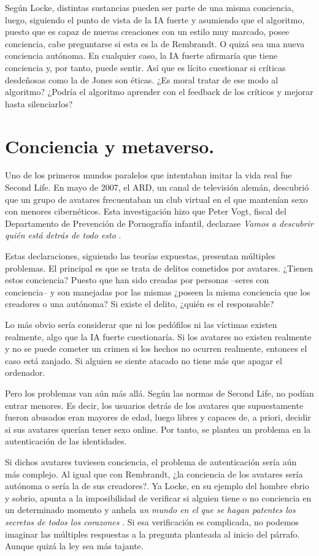 \documentclass[main.tex]{subfiles}
\begin{document}
Según Locke, distintas sustancias pueden ser parte de una misma conciencia, luego, siguiendo el punto de vista de la IA fuerte y asumiendo que el algoritmo, puesto que es capaz de nuevas creaciones con un estilo muy marcado, posee conciencia, cabe preguntarse si esta es la de Rembrandt. O quizá sea una nueva conciencia autónoma. En cualquier caso, la IA fuerte afirmaría que tiene conciencia y, por tanto, puede sentir. Así que es lícito cuestionar si críticas desdeñosas como la de Jones son éticas. ¿Es moral tratar de ese modo al algoritmo? ¿Podría el algoritmo aprender con el feedback de los críticos y mejorar hasta silenciarlos?


\section{Conciencia y metaverso.}


Uno de los primeros mundos paralelos que intentaban imitar la vida real fue Second Life. En mayo de 2007, el ARD, un canal de televisión alemán, descubrió que un grupo de avatares frecuentaban un club virtual en el que mantenían sexo con menores cibernéticos. Esta investigación hizo que Peter Vogt, fiscal del Departamento de Prevención de Pornografía infantil, declarase \textit{Vamos a descubrir quién está detrás de todo esto} \cite{del2l}.

Estas declaraciones, siguiendo las teorías expuestas, presentan múltiples problemas. El principal es que se trata de delitos cometidos por avatares. ¿Tienen estos conciencia? Puesto que han sido creadas por personas –seres con conciencia– y son manejadas por las mismas ¿poseen la misma conciencia que los creadores o una autónoma? Si existe el delito, ¿quién es el responsable?

Lo más obvio sería considerar que ni los pedófilos ni las víctimas existen realmente, algo que la IA fuerte cuestionaría. Si los avatares no existen realmente y no se puede cometer un crimen si los hechos no ocurren realmente, entonces el caso está zanjado. Si alguien se siente atacado no tiene más que apagar el ordenador.

Pero los problemas van aún más allá. Según las normas de Second Life, no podían entrar menores. Es decir, los usuarios detrás de los avatares que supuestamente fueron abusados eran mayores de edad, luego libres y capaces de, a priori, decidir si sus avatares querían tener sexo online. Por tanto, se plantea un problema en la autenticación de las identidades. 


Si dichos avatares tuviesen conciencia, el problema de autenticación sería aún más complejo. Al igual que con Rembrandt, ¿la conciencia de los avatares sería autónoma o sería la de sus creadores?. Ya Locke, en su ejemplo del hombre ebrio y sobrio, apunta a la imposibilidad de verificar si alguien tiene o no conciencia en un determinado momento y anhela \textit{un mundo en el que se hagan patentes los secretos de todos los corazones} \cite{nidditch1975john}. Si esa verificación es complicada, no podemos imaginar las múltiples respuestas a la pregunta planteada al inicio del párrafo. Aunque quizá la ley sea más tajante. 
\end{document}
